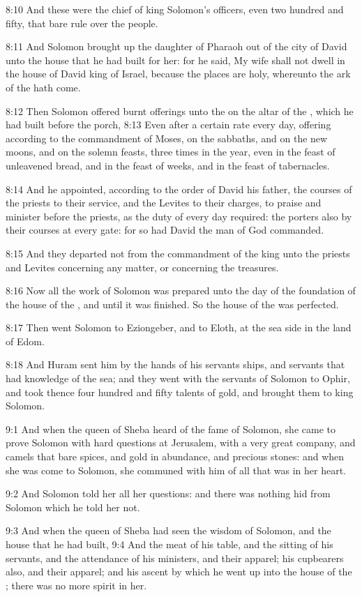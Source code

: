 8:10 And these were the chief of king Solomon's officers, even two
hundred and fifty, that bare rule over the people.

8:11 And Solomon brought up the daughter of Pharaoh out of the city of
David unto the house that he had built for her: for he said, My wife
shall not dwell in the house of David king of Israel, because the
places are holy, whereunto the ark of the \LORD hath come.

8:12 Then Solomon offered burnt offerings unto the \LORD on the altar
of the \LORD, which he had built before the porch, 8:13 Even after a
certain rate every day, offering according to the commandment of
Moses, on the sabbaths, and on the new moons, and on the solemn
feasts, three times in the year, even in the feast of unleavened
bread, and in the feast of weeks, and in the feast of tabernacles.

8:14 And he appointed, according to the order of David his father, the
courses of the priests to their service, and the Levites to their
charges, to praise and minister before the priests, as the duty of
every day required: the porters also by their courses at every gate:
for so had David the man of God commanded.

8:15 And they departed not from the commandment of the king unto the
priests and Levites concerning any matter, or concerning the
treasures.

8:16 Now all the work of Solomon was prepared unto the day of the
foundation of the house of the \LORD, and until it was finished. So the
house of the \LORD was perfected.

8:17 Then went Solomon to Eziongeber, and to Eloth, at the sea side in
the land of Edom.

8:18 And Huram sent him by the hands of his servants ships, and
servants that had knowledge of the sea; and they went with the
servants of Solomon to Ophir, and took thence four hundred and fifty
talents of gold, and brought them to king Solomon.

9:1 And when the queen of Sheba heard of the fame of Solomon, she came
to prove Solomon with hard questions at Jerusalem, with a very great
company, and camels that bare spices, and gold in abundance, and
precious stones: and when she was come to Solomon, she communed with
him of all that was in her heart.

9:2 And Solomon told her all her questions: and there was nothing hid
from Solomon which he told her not.

9:3 And when the queen of Sheba had seen the wisdom of Solomon, and
the house that he had built, 9:4 And the meat of his table, and the
sitting of his servants, and the attendance of his ministers, and
their apparel; his cupbearers also, and their apparel; and his ascent
by which he went up into the house of the \LORD; there was no more
spirit in her.

